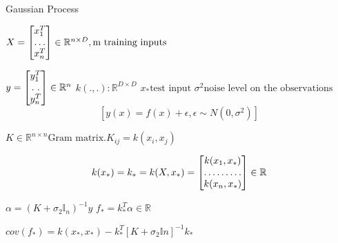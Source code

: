 \documentclass[a4paper]{article}
\begin{document}
 \begin{algorithm}
   \caption{Gaussian Process ~\cite{gaussian1
   }}
    \begin{algorithmic}[1]
  \INPUT 
 \Statex $X =  \begin{bmatrix}
 	x_{1}^T\\
 	\hdotsfor{1}\\
    x_{n}^T 
 \end{bmatrix} \in 	\mathbb{R}^{ n \times D} , \text{m training inputs}
 $
 
  \Statex $y =  \begin{bmatrix}
 	y_{1}^T\\
 	\hdotsfor{1}\\
    y_{n}^T 
 \end{bmatrix} \in 	\mathbb{R}^{ n}
 $ 
 \Statex $k(.,.): \mathbb{R}^ {D \times D}$
 \Statex $x_{*} \text{test input}$
 \Statex $\sigma^{2} \text{noise level on the observations}$
 $$[y(x) = f(x) + \epsilon , \epsilon \sim N (0, \sigma^{2})] $$

\State $K \in \mathbb{R}^{n \times n} \text{Gram matrix}. K_{ij} = k(x_{i}, x_{j})
$

$$k(x_{*}) = k_{*} = k(X,x_{*}) = \begin{bmatrix}
	k{(x_{1},x_{*})}\\
 	\hdotsfor{1}\\
    k{(x_{n},x_{*})}
 \end{bmatrix} \in \mathbb{R}
 $$
 
 \State $\alpha = (K + \sigma_{2}\mathbb{I}_{n})^{-1}y$
 \State $f_{*} = k_{*}^{T}\alpha \in \mathbb{R} $
 
 \State $cov(f_{*}) = k(x_{*},x_{*}) - k_{*}^T[K+\sigma_{2}\mathbb{I}n]^{-1}k_{*}$



\end{algorithmic}
\end{algorithm}
\end{document}
